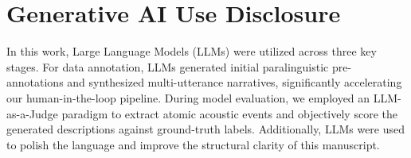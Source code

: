 \documentclass{Interspeech}
\begin{document}
\section{Generative AI Use Disclosure}
In this work, Large Language Models (LLMs) were utilized across three key stages. For data annotation, LLMs generated initial paralinguistic pre-annotations and synthesized multi-utterance narratives, significantly accelerating our human-in-the-loop pipeline. During model evaluation, we employed an LLM-as-a-Judge paradigm to extract atomic acoustic events and objectively score the generated descriptions against ground-truth labels. Additionally, LLMs were used to polish the language and improve the structural clarity of this manuscript.





\end{document}

